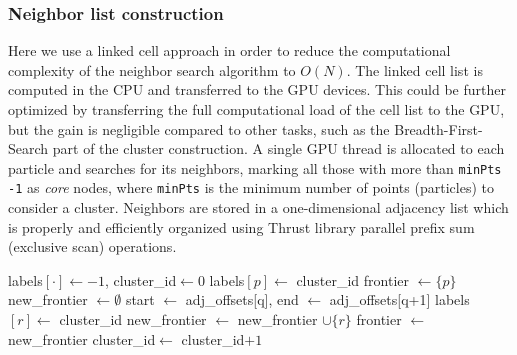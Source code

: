 \documentclass[final,1p,times]{elsarticle}
\begin{document}
\subsubsection{Neighbor list construction}
Here we use a linked cell approach\cite{AllenTildesleybook} in order to reduce the computational complexity of the neighbor search algorithm to $O(N)$. The linked cell list is computed in the CPU and transferred to the GPU devices. This could be further optimized by transferring the full computational load of the cell list to the GPU\cite{Schwiebert2014}, but the gain is negligible compared to other tasks, such as the Breadth-First-Search part\cite{Andrade2013} of the cluster construction. A single GPU thread is allocated to each particle and searches for its neighbors, marking all those with more than {\tt minPts -1} as {\em core} nodes, where {\tt minPts} is the minimum number of points (particles) to consider a cluster. Neighbors are stored in a one-dimensional adjacency list which is properly and efficiently organized using Thrust library parallel prefix sum (exclusive scan) operations\cite{ThrustDocumentation}.

\begin{algorithm}[tbp]
\caption{Cluster expansion (parallel BFS level)}
\label{alg:expand}
\begin{algorithmic}[1]
\State labels$[\cdot]\leftarrow -1$, cluster\_id$\leftarrow 0$
    \State labels$[p]\leftarrow$ cluster\_id
    \State frontier $\leftarrow \{p\}$
        \State new\_frontier $\leftarrow \emptyset$ 
            \State start $\leftarrow$ adj\_offsets[q], end $\leftarrow$ adj\_offsets[q+1]
                    \State labels$[r]\leftarrow$ cluster\_id
                     \State new\_frontier $\leftarrow$ new\_frontier $\cup \{r\}$ \EndIf
                \EndIf
            \EndFor
        \EndFor
        \State frontier $\leftarrow$ new\_frontier
    \EndWhile
    \State cluster\_id$\leftarrow$ cluster\_id$+1$
\EndFor
\EndProcedure
\end{algorithmic}
\end{algorithm}
\end{document}
